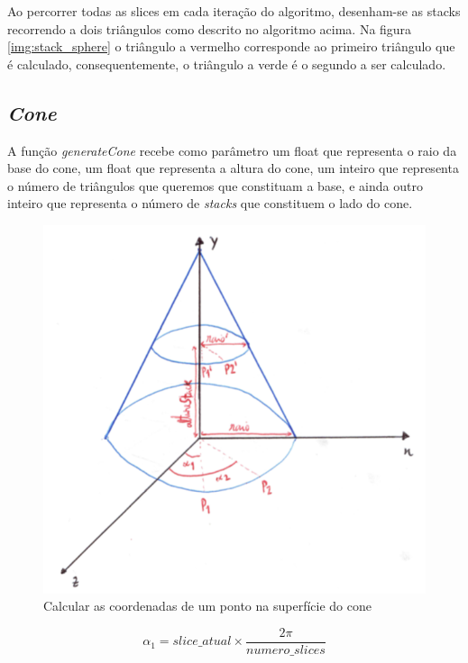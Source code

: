 \documentclass[a4paper]{article}
\begin{document}
Ao percorrer todas as slices em cada iteração do algoritmo, desenham-se as stacks recorrendo a dois triângulos como descrito no algoritmo acima. Na figura \ref{img:stack_sphere} o triângulo a vermelho corresponde ao primeiro triângulo que é calculado, consequentemente, o triângulo a verde é o segundo a ser calculado.

\newpage

\subsection{\textit{Cone}}
\label{sec:cone}
A função \textit{generateCone} recebe como parâmetro um float que representa o raio da base do cone, um float que representa a altura do cone, um inteiro que representa o número de triângulos que queremos que constituam a base, e ainda outro inteiro que representa o número de \textit{stacks} que constituem o lado do cone.


\begin{figure}[H]
\centering
\includegraphics[scale=0.50]{cone_pontos.png}
\caption{Calcular as coordenadas de um ponto na superfície do cone}
\label{img:cone_pontos}
\end{figure}

\ttfamily
$$\alpha_{1} = slice\_atual \times \frac{2\pi}{numero\_slices} $$

\vspace{0.5cm}
\end{document}
